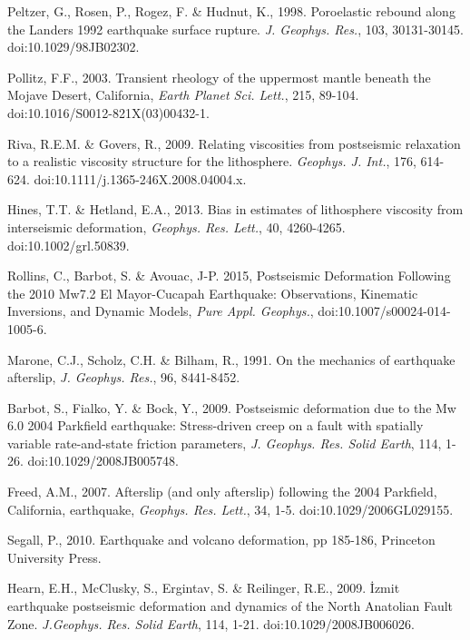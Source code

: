 \documentclass[12pt]{article}
\begin{document}
\begin{thebibliography}{}
 Peltzer, G., Rosen, P.,
  Rogez, F. \& Hudnut, K., 1998. Poroelastic rebound along the Landers
  1992 earthquake surface rupture. \textit{J. Geophys. Res.}, 103,
  30131-30145. doi:10.1029/98JB02302.

 Pollitz, F.F., 2003. Transient
  rheology of the uppermost mantle beneath the Mojave Desert,
  California, \textit{Earth Planet Sci. Lett.}, 215,
  89-104. doi:10.1016/S0012-821X(03)00432-1.

 Riva, R.E.M. \&
  Govers, R., 2009. Relating viscosities from postseismic relaxation
  to a realistic viscosity structure for the
  lithosphere. \textit{Geophys. J.  Int.}, 176,
  614-624. doi:10.1111/j.1365-246X.2008.04004.x.

 Hines, T.T. \&
  Hetland, E.A., 2013. Bias in estimates of lithosphere viscosity from
  interseismic deformation, \textit{Geophys. Res. Lett.}, 40,
  4260-4265. doi:10.1002/grl.50839.

 Rollins, C., Barbot,
  S. \& Avouac, J-P. 2015, Postseismic Deformation Following the 2010
  Mw7.2 El Mayor-Cucapah Earthquake: Observations, Kinematic
  Inversions, and Dynamic Models, \textit{Pure Appl. Geophys.},
  doi:10.1007/s00024-014-1005-6.

 Marone, C.J., Scholz,
  C.H.  \& Bilham, R., 1991. On the mechanics of earthquake
  afterslip, \textit{J. Geophys. Res.}, 96, 8441-8452.

 Barbot, S., Fialko, Y. \& Bock,
  Y., 2009. Postseismic deformation due to the Mw 6.0 2004 Parkfield
  earthquake: Stress-driven creep on a fault with spatially variable
  rate-and-state friction parameters, \textit{J. Geophys. Res. Solid
  Earth}, 114, 1-26. doi:10.1029/2008JB005748.

 Freed, A.M., 2007. Afterslip
  (and only afterslip) following the 2004 Parkfield, California,
  earthquake, \textit{Geophys. Res. Lett.}, 34,
  1-5. doi:10.1029/2006GL029155.

 Segall, P., 2010. Earthquake and
  volcano deformation, pp 185-186, Princeton University Press.

 Hearn, E.H., McClusky,
  S., Ergintav, S. \& Reilinger, R.E., 2009. \.Izmit earthquake
  postseismic deformation and dynamics of the North Anatolian Fault
  Zone. \textit{J.Geophys. Res. Solid Earth}, 114,
  1-21. doi:10.1029/2008JB006026.


\end{thebibliography}
\end{document}
